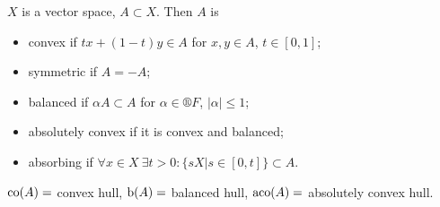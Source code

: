 \documentclass[12pt]{article}					%
\begin{document}
\begin{definice}
	$X$ is a vector space, $A \subset X$. Then $A$ is
	\begin{itemize}
		\item convex if $tx + (1 - t)y \in A$ for $x, y \in A$, $t \in [0, 1]$;
		\item symmetric if $A = -A$;
		\item balanced if $α A \subset A$ for $α \in ®F$, $|α| ≤ 1$;
		\item absolutely convex if it is convex and balanced;
		\item absorbing if $\forall x \in X\ \exists t > 0: \{s X | s \in [0, t]\} \subset A$.
	\end{itemize}
\end{definice}

\begin{definice}
	$\operatorname{co}(A) = $ convex hull, $\operatorname{b}(A) = $ balanced hull, $\operatorname{aco}(A) = $ absolutely convex hull.
\end{definice}
\end{document}
